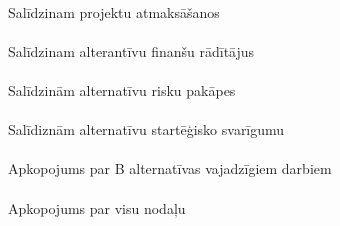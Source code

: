 \paragraph{}
Salīdzinam projektu atmaksāšanos
\paragraph{}
Salīdzinam alterantīvu finanšu rādītājus
\paragraph{}
Salīdzinām alternatīvu risku pakāpes
\paragraph{}
Salīdiznām alternatīvu startēģisko svarīgumu
\paragraph{}
Apkopojums par B alternatīvas vajadzīgiem darbiem
\paragraph{}
Apkopojums par visu nodaļu
